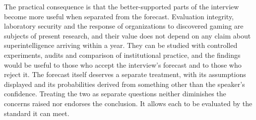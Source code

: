 \documentclass[11pt]{article}
\begin{document}
The practical consequence is that the better-supported parts of the interview become more useful when separated from the forecast. Evaluation integrity, laboratory security and the response of organizations to discovered gaming are subjects of present research, and their value does not depend on any claim about superintelligence arriving within a year. They can be studied with controlled experiments, audits and comparison of institutional practice, and the findings would be useful to those who accept the interview's forecast and to those who reject it. The forecast itself deserves a separate treatment, with its assumptions displayed and its probabilities derived from something other than the speaker's confidence. Treating the two as separate questions neither diminishes the concerns raised nor endorses the conclusion. It allows each to be evaluated by the standard it can meet.
\end{document}
